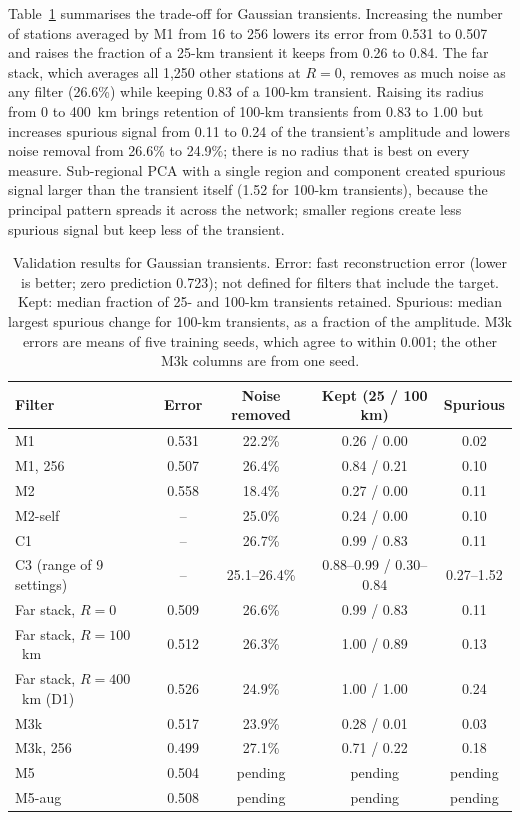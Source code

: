 \documentclass[11pt,a4paper]{article}
\begin{document}
Table~\ref{tab:blobs} summarises the trade-off for Gaussian transients. Increasing the number of stations averaged by M1 from 16 to 256 lowers its error from 0.531 to 0.507 and raises the fraction of a 25-km transient it keeps from 0.26 to 0.84. The far stack, which averages all 1,250 other stations at $R = 0$, removes as much noise as any filter (26.6\%) while keeping 0.83 of a 100-km transient. Raising its radius from 0 to 400~km brings retention of 100-km transients from 0.83 to 1.00 but increases spurious signal from 0.11 to 0.24 of the transient's amplitude and lowers noise removal from 26.6\% to 24.9\%; there is no radius that is best on every measure. Sub-regional PCA with a single region and component created spurious signal larger than the transient itself (1.52 for 100-km transients), because the principal pattern spreads it across the network; smaller regions create less spurious signal but keep less of the transient.

\begin{table}[ht]
\centering
\small
\caption{Validation results for Gaussian transients. Error: fast reconstruction error (lower is better; zero prediction 0.723); not defined for filters that include the target. Kept: median fraction of 25- and 100-km transients retained. Spurious: median largest spurious change for 100-km transients, as a fraction of the amplitude. M3k errors are means of five training seeds, which agree to within 0.001; the other M3k columns are from one seed.}
\label{tab:blobs}
\begin{tabular}{lcccc}
\toprule
Filter & Error & Noise removed & Kept (25 / 100 km) & Spurious \\
\midrule
M1 & 0.531 & 22.2\% & 0.26 / 0.00 & 0.02 \\
M1, 256 & 0.507 & 26.4\% & 0.84 / 0.21 & 0.10 \\
M2 & 0.558 & 18.4\% & 0.27 / 0.00 & 0.11 \\
M2-self & -- & 25.0\% & 0.24 / 0.00 & 0.10 \\
C1 & -- & 26.7\% & 0.99 / 0.83 & 0.11 \\
C3 (range of 9 settings) & -- & 25.1--26.4\% & 0.88--0.99 / 0.30--0.84 & 0.27--1.52 \\
Far stack, $R = 0$ & 0.509 & 26.6\% & 0.99 / 0.83 & 0.11 \\
Far stack, $R = 100$~km & 0.512 & 26.3\% & 1.00 / 0.89 & 0.13 \\
Far stack, $R = 400$~km (D1) & 0.526 & 24.9\% & 1.00 / 1.00 & 0.24 \\
M3k & 0.517 & 23.9\% & 0.28 / 0.01 & 0.03 \\
M3k, 256 & 0.499 & 27.1\% & 0.71 / 0.22 & 0.18 \\
M5 & 0.504 & pending & pending & pending \\
M5-aug & 0.508 & pending & pending & pending \\
\bottomrule
\end{tabular}
\end{table}
\end{document}
